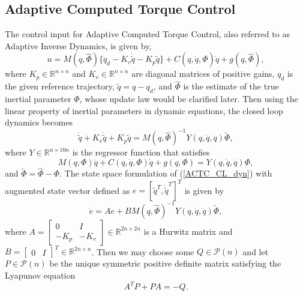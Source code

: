\documentclass[letterpaper, 10 pt, conference]{ieeeconf}  %
\begin{document}
\subsection{Adaptive Computed Torque Control \cite{Craig_AdaptiveControl}}
The control input for Adaptive Computed Torque Control, also referred to as Adaptive Inverse Dynamics, is given by,
\begin{equation}
u = M(q,\hat{\Phi})\{\ddot{q}_{d}-K_{v}\dot{\tilde{q}}-K_{p}\tilde{q}\}+C(q,\dot{q},\hat{\Phi})\dot{q}+g(q,\hat{\Phi}), \label{ACTC_input}
\end{equation}
where $K_p\in\mathbb{R}^{n\times n}$ and $K_{v}\in\mathbb{R}^{n\times n}$ are diagonal matrices of positive gains, $q_{d}$ is the given reference trajectory, $\tilde{q} = q - q_d$, and $\hat{\Phi}$ is the estimate of the true inertial parameter $\Phi$, whose update law would be clarified later. Then using the linear property of inertial parameters in dynamic equations, the closed loop dynamics becomes
\begin{equation}
\ddot{\tilde{q}}+K_{v}\dot{\tilde{q}}+K_{p}\tilde{q}=M(q,\hat{\Phi})^{-1}Y(q,\dot{q},\ddot{q})\tilde{\Phi}, \label{ACTC_CL_dyn}
\end{equation}
where $Y\in \mathbb{R}^{n\times10n}$ is the regressor function that satisfies
\begin{equation}
M(q,\Phi)\ddot{q}+C(q,\dot{q},\Phi)\dot{q} + g(q,\Phi) = Y(q,\dot{q},\ddot{q})\Phi,
\end{equation}
 and $\tilde{\Phi} =\hat{\Phi}-\Phi$. The state space formulation of (\ref{ACTC_CL_dyn}) with augmented state vector defined as $e=[\tilde{q}^{T}, \dot{\tilde{q}}^{T}]^{T}$ is given by 
\begin{equation}
\dot{e} = Ae+BM(q,\hat{\Phi})^{-1}Y(q,\dot{q},\ddot{q})\tilde{\Phi}, \label{ACTC_CL_error_dyn}
\end{equation}
where $A = \left[\begin{array}{cc} 0 & I \\ -K_{p} & -K_{v}\end{array}\right]\in \mathbb{R}^{2n\times2n}$ is a Hurwitz matrix and $B=\left[\begin{array}{cc} 0 & I\end{array}\right]^T\in\mathbb{R}^{2n\times n}$. Then we may choose some $Q \in \mathcal{P}(n)$ and let $P \in \mathcal{P}(n)$ be the unique symmetric positive definite matrix satisfying the Lyapunov equation
\begin{equation}
A^{T}P + PA = -Q. \label{ACTC_lyapunov_eq}
\end{equation}
\end{document}
